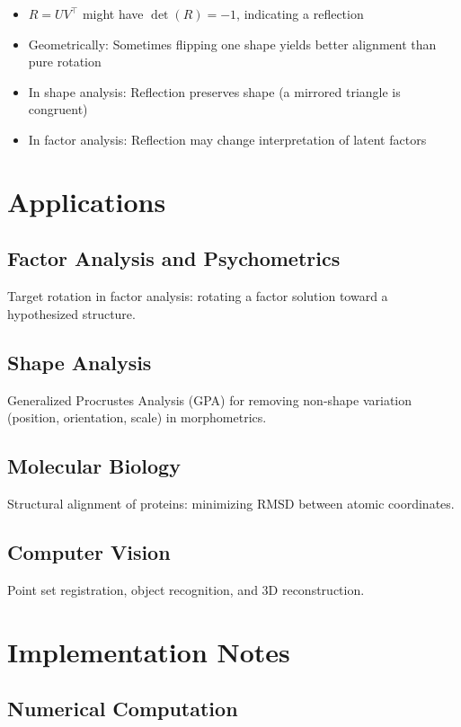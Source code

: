 \documentclass[11pt]{article}
\begin{document}
\begin{itemize}
    \item $R = U V^\top$ might have $\det(R) = -1$, indicating a reflection
    \item Geometrically: Sometimes flipping one shape yields better alignment than pure rotation
    \item In shape analysis: Reflection preserves shape (a mirrored triangle is congruent)
    \item In factor analysis: Reflection may change interpretation of latent factors
\end{itemize}

\section{Applications}
\label{sec:applications}

\subsection{Factor Analysis and Psychometrics}
\label{subsec:factor-analysis}
Target rotation in factor analysis: rotating a factor solution toward a hypothesized structure.

\subsection{Shape Analysis}
\label{subsec:shape-analysis}
Generalized Procrustes Analysis (GPA) for removing non-shape variation (position, orientation, scale) in morphometrics.

\subsection{Molecular Biology}
\label{subsec:molecular-bio}
Structural alignment of proteins: minimizing RMSD between atomic coordinates.

\subsection{Computer Vision}
\label{subsec:computer-vision}
Point set registration, object recognition, and 3D reconstruction.

\section{Implementation Notes}
\label{sec:implementation}

\subsection{Numerical Computation}
\label{subsec:numerical}
\end{document}
